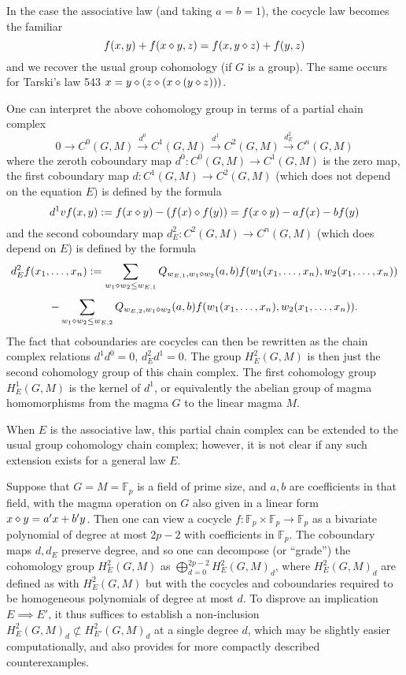 \begin{remark} In the case the associative law (and taking $a=b=1$), the cocycle law becomes the familiar
  $$ f(x,y) + f(x \diamond y, z) = f(x, y \diamond z) + f(y,z)$$
and we recover the usual group cohomology (if $G$ is a group).  The same occurs for Tarski's law 543
$x = y \diamond (z \diamond (x \diamond (y \diamond z)))$.
\end{remark}

\begin{remark}  One can interpret the above cohomology group in terms of a partial chain complex
$$ 0 \to C^0(G,M) \stackrel{d^0}{\to} C^1(G,M) \stackrel{d^1}{\to} C^2(G,M) \stackrel{d^2_E}{\to} C^n(G,M)$$
where the zeroth coboundary map $d^0: C^0(G,M) \to C^1(G,M)$ is the zero map, the first coboundary map $d: C^1(G,M) \to C^2(G,M)$ (which does not depend on the equation $E$) is defined by the formula
$$ d^1 vf(x,y) := f(x \diamond y) - (f(x) \diamond f(y)) = f(x \diamond y) - af(x) - bf(y)$$
and the second coboundary map $d^2_E: C^2(G,M) \to C^n(G,M)$ (which does depend on $E$) is defined by the formula
$$ d^2_E f(x_1,\dots,x_n) := \sum_{w_1 \diamond w_2 \leq w_{E,1}} Q_{w_{E,1},w_1 \diamond w_2}(a,b) f(w_1(x_1,\dots,x_n), w_2(x_1,\dots,x_n))$$
$$ - \sum_{w_1 \diamond w_2 \leq w_{E,2}} Q_{w_{E,2},w_1 \diamond w_2}(a,b) f(w_1(x_1,\dots,x_n), w_2(x_1,\dots,x_n)).$$
The fact that coboundaries are cocycles can then be rewritten as the chain complex relations $d^1 d^0=0$, $d^2_E d^1 = 0$.  The group $H^2_E(G,M)$ is then just the second cohomology group of this chain complex.  The first cohomology group $H^1_E(G,M)$ is the kernel of $d^1$, or equivalently the abelian group of magma homomorphisms from the magma $G$ to the linear magma $M$.

When $E$ is the associative law, this partial chain complex can be extended to the usual group cohomology chain complex; however, it is not clear if any such extension exists for a general law $E$.
\end{remark}

\begin{remark}  Suppose that $G = M = \mathbb{F}_p$ is a field of prime size, and $a,b$ are coefficients in that field, with the magma operation on $G$ also given in a linear form $x \diamond y = a'x  + b' y$.  Then one can view a cocycle $f: \mathbb{F}_p \times \mathbb{F}_p \to \mathbb{F}_p$ as a bivariate polynomial of degree at most $2p-2$ with coefficients in $ \mathbb{F}_p$.  The coboundary maps $d, d_E$ preserve degree, and so one can decompose (or ``grade'') the cohomology group $H^2_E(G,M)$ as $\bigoplus_{d=0}^{2p-2} H^2_E(G,M)_d$, where $H^2_E(G,M)_d$ are defined as with $H^2_E(G,M)$ but with the cocycles and coboundaries required to be homogeneous polynomials of degree at most $d$.  To disprove an implication $E \implies E'$, it thus suffices to establish a non-inclusion $H^2_E(G,M)_d \not\subset H^2_{E'}(G,M)_d$ at a single degree $d$, which may be slightly easier computationally, and also provides for more compactly described counterexamples.
\end{remark}
